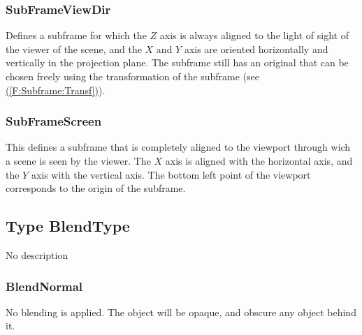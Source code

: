 \documentclass[10pt]{book}
\newcommand{\linkitem}[1]{\hyperref[#1]{\nameref{#1} (\ref{#1})}}
\begin{document}
\subsubsection{SubFrameViewDir \label{T:SubFrameType|SubFrameViewDir}}
Defines a subframe for which the $Z$ axis is always aligned to the light of sight of the viewer of the scene, and the $X$ and $Y$ axis are oriented horizontally and vertically in the projection plane. The subframe still has an original that can be chosen freely using the transformation of the subframe (see \linkitem{F:Subframe:Transf}).

\subsubsection{SubFrameScreen \label{T:SubFrameType|SubFrameScreen}}
This defines a subframe that is completely aligned to the viewport through wich a scene is seen by the viewer. The $X$ axis is aligned with the horizontal axis, and the $Y$ axis with the vertical axis. The bottom left point of the viewport corresponds to the origin of the subframe.

\subsection{Type BlendType \label{T:BlendType}}
No description

\subsubsection{BlendNormal \label{T:BlendType|BlendNormal}}
No blending is applied. The object will be opaque, and obscure any object behind it.
\end{document}

